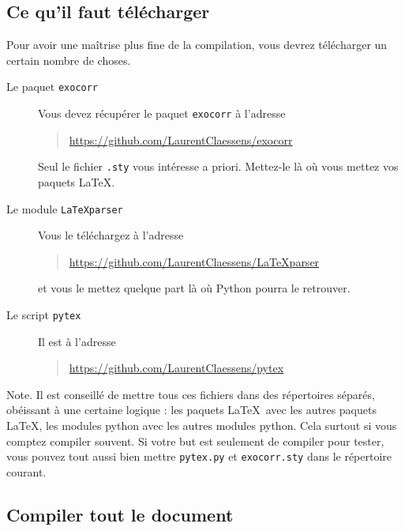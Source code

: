 \documentclass[a4paper,12pt]{article}
\newcommand{\info}[1]{\texttt{#1}}
\begin{document}
\subsection{Ce qu'il faut télécharger}

Pour avoir une maîtrise plus fine de la compilation, vous devrez télécharger un certain nombre de choses.
\begin{description}
    \item[Le paquet \info{exocorr}]
        Vous devez récupérer le paquet \info{exocorr} à l'adresse
        \begin{quote}
            \url{https://github.com/LaurentClaessens/exocorr}
        \end{quote}
        Seul le fichier \info{.sty} vous intéresse a priori. Mettez-le là où vous mettez vos paquets \LaTeX.
    \item[Le module \info{LaTeXparser}]
        Vous le téléchargez à l'adresse
        \begin{quote}
            \url{https://github.com/LaurentClaessens/LaTeXparser}
        \end{quote}
        et vous le mettez quelque part là où Python pourra le retrouver.
    \item[Le script \info{pytex}]
        Il est à l'adresse
        \begin{quote}
            \url{https://github.com/LaurentClaessens/pytex}
        \end{quote}
\end{description}

Note. Il est conseillé de mettre tous ces fichiers dans des répertoires séparés, obéissant à une certaine logique : les paquets \LaTeX\ avec les autres paquets \LaTeX, les modules python avec les autres modules python. Cela surtout si vous comptez compiler souvent. Si votre but est seulement de compiler pour tester, vous pouvez tout aussi bien mettre \info{pytex.py} et \info{exocorr.sty} dans le répertoire courant.



\subsection{Compiler tout le document}
\end{document}
